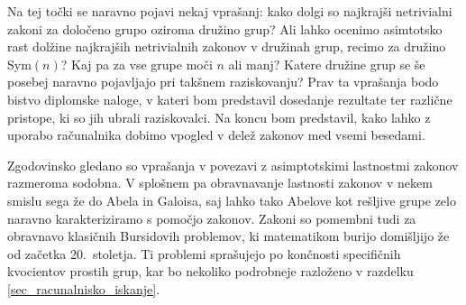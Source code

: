 Na tej točki se naravno pojavi nekaj vprašanj: kako dolgi so najkrajši netrivialni zakoni za določeno grupo oziroma družino grup? Ali lahko ocenimo
asimtotsko rast dolžine najkrajših netrivialnih zakonov v družinah grup, recimo za družino $\text{Sym}(n)$? Kaj pa za vse grupe moči $n$ ali manj? 
Katere družine grup se še posebej naravno pojavljajo pri takšnem raziskovanju?
Prav ta vprašanja bodo bistvo diplomske naloge, v kateri bom predstavil dosedanje
rezultate ter različne pristope, ki so jih ubrali raziskovalci. Na koncu bom predstavil,
kako lahko z uporabo računalnika dobimo vpogled v delež zakonov med vsemi besedami.

Zgodovinsko gledano so vprašanja v povezavi z asimptotskimi lastnostmi zakonov razmeroma sodobna. V splošnem pa obravnavanje lastnosti zakonov v nekem smislu sega že do Abela in Galoisa, 
saj lahko tako Abelove kot rešljive grupe zelo naravno karakteriziramo s pomočjo zakonov. Zakoni so pomembni tudi za obravnavo klasičnih Bursidovih problemov,
ki matematikom burijo domišljijo že od začetka 20.~stoletja. Ti problemi sprašujejo po končnosti specifičnih kvocientov prostih grup, kar bo nekoliko podrobneje razloženo v
razdelku \ref{sec_racunalnisko_iskanje}. 

